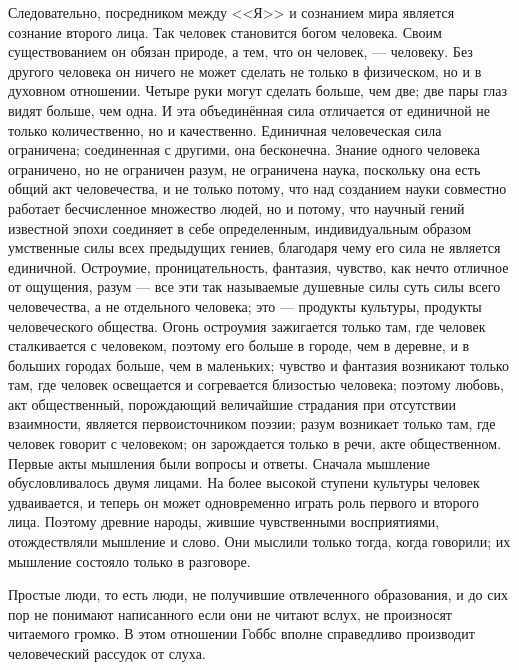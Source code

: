 \documentclass[12pt,oneside]{book}
\begin{document}
Следовательно, посредником между <<Я>> и сознанием мира является сознание второго лица. Так человек становится богом человека. Своим существованием он обязан природе, а тем, что он человек, --- человеку. Без другого человека он ничего не может сделать не только в физическом, но и в духовном отношении. Четыре руки могут сделать больше, чем две; две пары глаз видят больше, чем одна. И эта объединённая сила отличается от единичной не только количественно, но и качественно. Единичная человеческая сила ограничена; соединенная с другими, она бесконечна. Знание одного человека ограничено, но не ограничен разум, не ограничена наука, поскольку она есть общий акт человечества, и не только потому, что над созданием науки совместно работает бесчисленное множество людей, но и потому, что научный гений известной эпохи соединяет в себе определенным, индивидуальным образом умственные силы всех предыдущих гениев, благодаря чему его сила не является единичной. Остроумие, проницательность, фантазия, чувство, как нечто отличное от ощущения, разум --- все эти так называемые душевные силы суть силы всего человечества, а не отдельного человека; это --- продукты культуры, продукты человеческого общества. Огонь остроумия зажигается только там, где человек сталкивается с человеком, поэтому его больше в городе, чем в деревне, и в больших городах больше, чем в маленьких; чувство и фантазия возникают только там, где человек освещается и согревается близостью человека; поэтому любовь, акт общественный, порождающий величайшие страдания при отсутствии взаимности, является первоисточником поэзии; разум возникает только там, где человек говорит с человеком; он зарождается только в речи, акте общественном. Первые акты мышления были вопросы и ответы. Сначала мышление обусловливалось двумя лицами. На более высокой ступени культуры человек удваивается, и теперь он может одновременно играть роль первого и второго лица. Поэтому древние народы, жившие чувственными восприятиями, отождествляли мышление и слово. Они мыслили только тогда, когда говорили; их мышление состояло только в разговоре.

Простые люди, то есть люди, не получившие отвлеченного образования, и до сих пор не понимают написанного если они не читают вслух, не произносят читаемого громко. В этом отношении Гоббс вполне справедливо производит человеческий рассудок от слуха.
\end{document}
